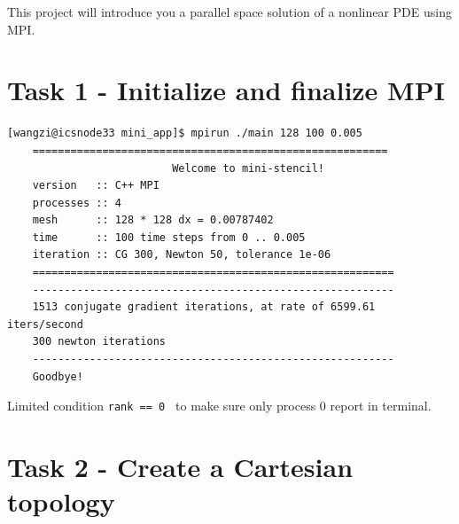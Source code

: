 \documentclass[unicode,11pt,a4paper,oneside,numbers=endperiod,openany]{scrartcl}
\begin{document}
\setassignment

\newline

\assignmentpolicy
This project will introduce you a parallel space solution of a nonlinear PDE using MPI.


\section{Task 1 - Initialize and finalize MPI }

\begin{lstlisting}[style=mystyle, language=MyBash, caption={Execution of mini-stencil Simulation}]
    [wangzi@icsnode33 mini_app]$ mpirun ./main 128 100 0.005
    ========================================================
                          Welcome to mini-stencil!
    version   :: C++ MPI
    processes :: 4
    mesh      :: 128 * 128 dx = 0.00787402
    time      :: 100 time steps from 0 .. 0.005
    iteration :: CG 300, Newton 50, tolerance 1e-06
    =========================================================
    ---------------------------------------------------------
    1513 conjugate gradient iterations, at rate of 6599.61 iters/second
    300 newton iterations
    ---------------------------------------------------------
    Goodbye!
\end{lstlisting}

Limited condition \texttt{rank == 0 } to make sure only process 0 report in terminal.

\section{Task 2 - Create a Cartesian topology }
\end{document}
